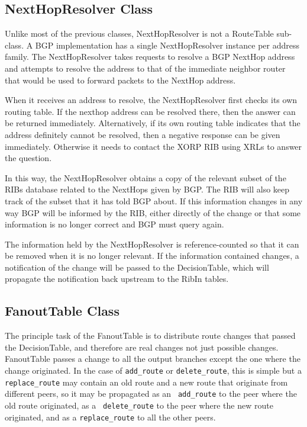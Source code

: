 \documentclass[11pt]{article}
\begin{document}
\subsection{NextHopResolver Class}

Unlike most of the previous classes, NextHopResolver is not a
RouteTable sub-class.  A BGP implementation has a single NextHopResolver
instance per address family.  The NextHopResolver takes requests to
resolve a BGP NextHop address and attempts to resolve the address to
that of the immediate neighbor router that would be used to forward
packets to the NextHop address.

When it receives an address to resolve, the NextHopResolver first
checks its own routing table.  If the nexthop address can be resolved
there, then the answer can be returned immediately.  Alternatively, if
its own routing table indicates that the address definitely cannot be
resolved, then a negative response can be given immediately.
Otherwise it needs to contact the XORP RIB using XRLs to answer the
question.  

In this way, the NextHopResolver obtains a copy of the relevant subset
of the RIBs database related to the NextHops given by BGP.  The RIB
will also keep track of the subset that it has told BGP about.  If
this information changes in any way BGP will be informed by the RIB,
either directly of the change or that some information is no longer
correct and BGP must query again.

The information held by the NextHopResolver is reference-counted so
that it can be removed when it is no longer relevant.  If the
information contained changes, a notification of the change will be
passed to the DecisionTable, which will propagate the notification
back upstream to the RibIn tables.

\subsection{FanoutTable Class}

The principle task of the FanoutTable is to distribute route changes
that passed the DecisionTable, and therefore are real changes not just
possible changes.  FanoutTable passes a change to all the output
branches except the one where the change originated.  In the case of
{\tt add\_route} or {\tt delete\_route}, this is simple but a {\tt
replace\_route} may contain an old route and a new route that
originate from different peers, so it may be propagated as an {\tt
add\_route} to the peer where the old route originated, as a {\tt
delete\_route} to the peer where the new route originated, and as a
{\tt replace\_route} to all the other peers.
\end{document}
